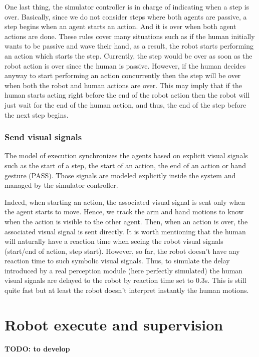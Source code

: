One last thing, the simulator controller is in charge of indicating when a step is over. Basically, since we do not consider steps where both agents are passive, a step begins when an agent starts an action. And it is over when both agent actions are done. These rules cover many situations such as if the human initially wants to be passive and wave their hand, as a result, the robot starts performing an action which starts the step. Currently, the step would be over as soon as the robot action is over since the human is passive. However, if the human decides anyway to start performing an action concurrently then the step will be over when both the robot and human actions are over. This may imply that if the human starts acting right before the end of the robot action then the robot will just wait for the end of the human action, and thus, the end of the step before the next step begins.  

\subsubsection{Send visual signals}

The model of execution synchronizes the agents based on explicit visual signals such as the start of a step, the start of an action, the end of an action or hand gesture (PASS). Those signals are modeled explicitly inside the system and managed by the simulator controller.

Indeed, when starting an action, the associated visual signal is sent only when the agent starts to move. Hence, we track the arm and hand motions to know when the action is visible to the other agent. Then, when an action is over, the associated visual signal is sent directly. It is worth mentioning that the human will naturally have a reaction time when seeing the robot visual signals (start/end of action, step start). However, so far, the robot doesn't have any reaction time to such symbolic visual signals. Thus, to simulate the delay introduced by a real perception module (here perfectly simulated) the human visual signals are delayed to the robot by reaction time set to 0.3s. This is still quite fast but at least the robot doesn't interpret instantly the human motions.   

\section{Robot execute and supervision}

\textbf{TODO: to develop}

